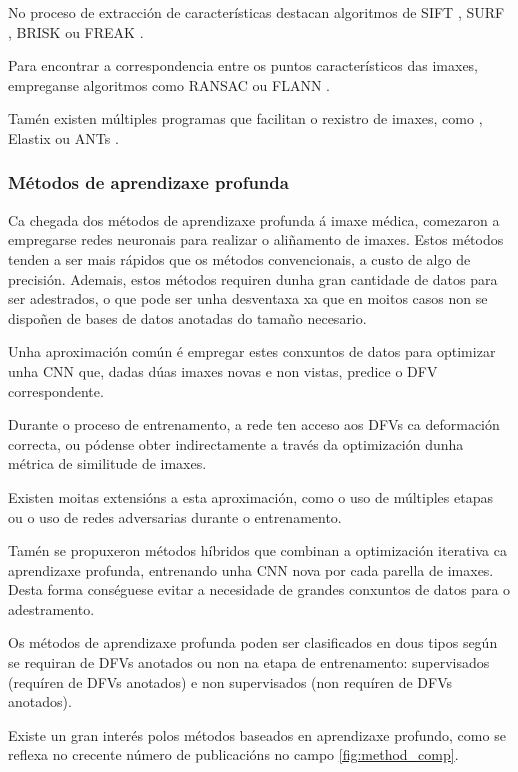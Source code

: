 No proceso de extracción de características destacan algoritmos de SIFT \cite{sift}, SURF \cite{surf}, BRISK \cite{brisk} ou FREAK \cite{freakkeypoint}.

Para encontrar a correspondencia entre os puntos característicos das imaxes, empreganse algoritmos como RANSAC \cite{ransac} ou FLANN \cite{flann}.

Tamén existen múltiples programas que facilitan o rexistro de imaxes, como \cite{simpleitk}, Elastix \cite{elastix} ou ANTs \cite{ants}.


\subsubsection{Métodos de aprendizaxe profunda}
\label{subsubsec:Métodos de aprendizaxe profunda}

Ca chegada dos métodos de aprendizaxe profunda á imaxe médica, comezaron a empregarse redes neuronais para realizar o aliñamento de imaxes.
Estos métodos tenden a ser mais rápidos que os métodos convencionais, a custo de algo de precisión. 
Ademais, estos métodos requiren dunha gran cantidade de datos para ser adestrados, 
o que pode ser unha desventaxa xa que en moitos casos non se dispoñen de bases de datos anotadas do tamaño necesario.

Unha aproximación común é empregar estes conxuntos de datos para optimizar unha CNN que,
 dadas dúas imaxes novas e non vistas, predice o DFV correspondente. \cite{defregcnn}

Durante o proceso de entrenamento, a rede ten acceso aos DFVs ca deformación correcta,
 ou pódense obter indirectamente a través da optimización dunha métrica de similitude de imaxes.

Existen moitas extensións a esta aproximación, como o uso de múltiples etapas ou o uso de redes adversarias durante o entrenamento.

Tamén se propuxeron métodos híbridos que combinan a optimización iterativa ca aprendizaxe profunda, 
entrenando unha CNN nova por cada parella de imaxes. Desta forma conséguese evitar a necesidade de grandes conxuntos de datos para o adestramento.

Os métodos de aprendizaxe profunda poden ser clasificados en dous tipos según se requiran de DFVs anotados ou non na etapa de entrenamento: 
supervisados (requíren de DFVs anotados) e non supervisados (non requíren de DFVs anotados). \cite{nie2024medicalimageregistrationapplication}

Existe un gran interés polos métodos baseados en aprendizaxe profundo, como se reflexa no crecente número de publicacións no campo \ref{fig:method_comp}.

